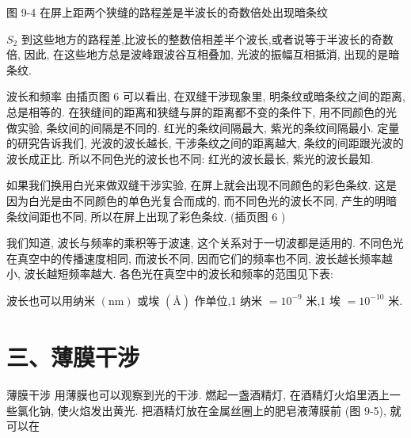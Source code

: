\documentclass[10pt]{article}
\begin{document}
图 9-4 在屏上距两个狭缝的路程差是半波长的奇数倍处出现暗条纹

\({S}_{2}\) 到这些地方的路程差,比波长的整数倍相差半个波长,或者说等于半波长的奇数倍, 因此, 在这些地方总是波峰跟波谷互相叠加, 光波的振幅互相抵消, 出现的是暗条纹.

波长和频率 由插页图 6 可以看出, 在双缝干涉现象里, 明条纹或暗条纹之间的距离, 总是相等的. 在狭缝间的距离和狭缝与屏的距离都不变的条件下, 用不同颜色的光做实验, 条纹间的间隔是不同的. 红光的条纹间隔最大, 紫光的条纹间隔最小. 定量的研究告诉我们, 光波的波长越长, 干涉条纹之间的距离越大, 条纹的间距跟光波的波长成正比. 所以不同色光的波长也不同: 红光的波长最长, 紫光的波长最知.

如果我们换用白光来做双缝干涉实验, 在屏上就会出现不同颜色的彩色条纹. 这是因为白光是由不同颜色的单色光复合而成的, 而不同色光的波长不同, 产生的明暗条纹间距也不同, 所以在屏上出现了彩色条纹. (插页图 6 )

我们知道, 波长与频率的乘积等于波速, 这个关系对于一切波都是适用的. 不同色光在真空中的传播速度相同, 而波长不同, 因而它们的频率也不同, 波长越长频率越小, 波长越短频率越大. 各色光在真空中的波长和频率的范围见下表:

\begin{center}
\end{center}

波长也可以用纳米 \(\left( \mathrm{{nm}}\right)\) 或埃 \(\left( Å\right)\) 作单位,1 纳米 \(= {10}^{-9}\) 米,1 埃 \(= {10}^{-{10}}\) 米.

\section*{三、薄膜干涉}

薄膜干涉 用薄膜也可以观察到光的干涉. 燃起一盏酒精灯, 在酒精灯火焰里洒上一些氯化钠, 使火焰发出黄光. 把酒精灯放在金属丝圈上的肥皂液薄膜前 (图 9-5), 就可以在
\end{document}
